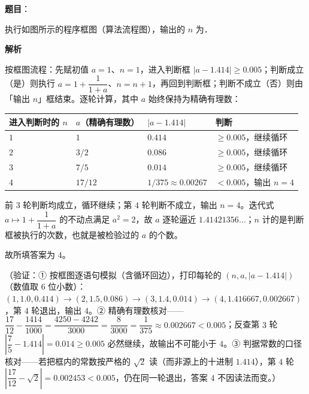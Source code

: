 \begin{answer}

\textbf{题目}：

执行如图所示的程序框图（算法流程图），输出的 \(n\) 为\gkblank{}．
\nopagebreak[4]
\begin{center}\end{center}
\nopagebreak[4]
\textbf{解析}

按框图流程：先赋初值 \(a=1\)、\(n=1\)，进入判断框 \(\lvert a-1.414\rvert\geqslant0.005\)；判断成立（是）则执行 \(a=1+\dfrac{1}{1+a}\)、\(n=n+1\)，再回到判断框；判断不成立（否）则由「输出 \(n\)」框结束。逐轮计算，其中 \(a\) 始终保持为精确有理数：

\begin{center}
\begin{tabular}{llll}
\toprule
进入判断时的 \(n\) & \(a\)（精确有理数） & \(\lvert a-1.414\rvert\) & 判断 \\
\midrule
\(1\) & \(1\) & \(0.414\) & \(\geqslant0.005\)，继续循环 \\
\(2\) & \(3/2\) & \(0.086\) & \(\geqslant0.005\)，继续循环 \\
\(3\) & \(7/5\) & \(0.014\) & \(\geqslant0.005\)，继续循环 \\
\(4\) & \(17/12\) & \(1/375\approx0.00267\) & \(<0.005\)，输出 \(n=4\) \\
\bottomrule
\end{tabular}
\end{center}

前 \(3\) 轮判断均成立，循环继续；第 \(4\) 轮判断不成立，输出 \(n=4\)。迭代式 \(a\mapsto1+\dfrac{1}{1+a}\) 的不动点满足 \(a^{2}=2\)，故 \(a\) 逐轮逼近 \(1.41421356\ldots\)；\(n\) 计的是判断框被执行的次数，也就是被检验过的 \(a\) 的个数。

故所填答案为 \(4\)。

（验证：① 按框图逐语句模拟（含循环回边），打印每轮的 \((n,a,\lvert a-1.414\rvert)\)（数值取 6 位小数）：\((1,1.0,0.414)\to(2,1.5,0.086)\to(3,1.4,0.014)\to(4,1.416667,0.002667)\)，第 \(4\) 轮退出，输出 \(4\)。② 精确有理数核对——\(\dfrac{17}{12}-\dfrac{1414}{1000}=\dfrac{4250-4242}{3000}=\dfrac{8}{3000}=\dfrac{1}{375}\approx0.002667<0.005\)；反查第 \(3\) 轮 \(\left|\dfrac{7}{5}-1.414\right|=0.014\geqslant0.005\) 必然继续，故输出不可能小于 \(4\)。③ 判据常数的口径核对——若把框内的常数按严格的 \(\sqrt{2}\) 读（而非源上的十进制 \(1.414\)），第 \(4\) 轮 \(\left|\dfrac{17}{12}-\sqrt{2}\right|=0.002453<0.005\)，仍在同一轮退出，答案 \(4\) 不因读法而变。）


\end{answer}
